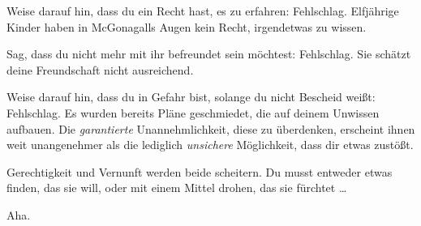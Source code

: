 \begin{em}
Weise darauf hin, dass du ein Recht hast, es zu erfahren: Fehlschlag. Elfjährige Kinder haben in McGonagalls Augen kein Recht, irgendetwas zu wissen.

Sag, dass du nicht mehr mit ihr befreundet sein möchtest: Fehlschlag. Sie schätzt deine Freundschaft nicht ausreichend.

Weise darauf hin, dass du in Gefahr bist, solange du nicht Bescheid weißt: Fehlschlag. Es wurden bereits Pläne geschmiedet, die auf deinem Unwissen aufbauen. Die \emph{garantierte} Unannehmlichkeit, diese zu überdenken, erscheint ihnen weit unangenehmer als die lediglich \emph{unsichere} Möglichkeit, dass dir etwas zustößt.

Gerechtigkeit und Vernunft werden beide scheitern. Du musst entweder etwas finden, das sie will, oder mit einem Mittel drohen, das sie fürchtet …
\end{em}

Aha.

